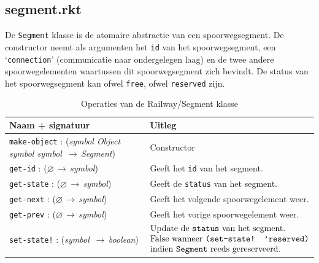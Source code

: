 \documentclass[a4paper, 11pt]{article}
\newcommand{\naar}{\,$\rightarrow$\,}
\renewcommand{\empty}{$\varnothing$}
\newcommand{\<}{\scriptsize\textless\normalsize}
\renewcommand{\>}{\scriptsize\textgreater\normalsize}
\begin{document}
\subsection{segment.rkt} %
De \texttt{Segment} klasse is de atomaire abstractie van een spoorwegsegment. De constructor neemt als argumenten het \texttt{id} van het spoorwegsegment, een \lq\texttt{connection}' (communicatie naar ondergelegen laag) en de twee andere spoorwegelementen waartussen dit spoorwegsegment zich bevindt. De status van het spoorwegsegment kan ofwel \texttt{free}, ofwel \texttt{reserved} zijn.
\begin{table}[H]
	\begin{center}
		{
		\begin{tabular}{|l l|}
			\hline
			\textbf{Naam + signatuur} & \textbf{Uitleg}\\
			\hline
			\texttt{make-object} : (\textit{symbol Object symbol symbol} \naar \textit{Segment}) & Constructor\\
			\hline
			\texttt{get-id} : (\empty \naar \textit{symbol}) & Geeft het \texttt{id} van het segment.\\
			\texttt{get-state} : (\empty \naar \textit{symbol}) & Geeft de \texttt{status} van het segment.\\
			\texttt{get-next} : (\empty \naar \textit{symbol}) & Geeft het volgende spoorwegelement weer.\\
			\texttt{get-prev} : (\empty \naar \textit{symbol}) & Geeft het vorige spoorwegelement weer.\\
			\texttt{set-state!} : (\textit{symbol} \naar \textit{boolean}) &
			$\begin{matrix*}[l]
				\text{Update de \texttt{status} van het segment.}\\
				\text{False wanneer \texttt{(set-state! 'reserved)}}\\
				\text{indien \texttt{Segment} reeds gereserveerd.}\\
			\end{matrix*}$\\
			\hline
		\end{tabular}}
		\caption{Operaties van de Railway/Segment klasse}
	\end{center}
\end{table}

\end{document}
